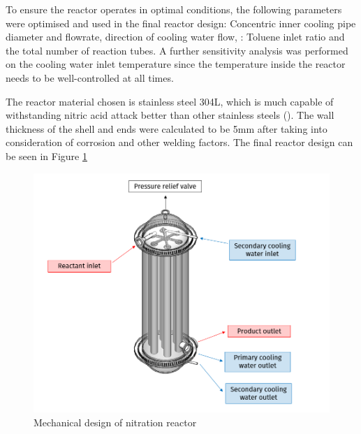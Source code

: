 To ensure the reactor operates in optimal conditions, the following parameters were optimised and used in the final reactor design: Concentric inner cooling pipe diameter and flowrate, direction of cooling water flow,  : Toluene inlet ratio and the total number of reaction tubes. A further sensitivity analysis was performed on the cooling water inlet temperature since the temperature inside the reactor needs to be well-controlled at all times. %


The reactor material chosen is stainless steel 304L, which is much capable of withstanding nitric acid attack better than other stainless steels (). The wall thickness of the shell and ends were calculated to be 5mm after taking into consideration of corrosion and other welding factors. 
The final reactor design can be seen in Figure \ref{fig:executivesummaryreactor}
\begin{figure}[h]
    \centering
    \includegraphics[width=0.7\linewidth]{chapters/0-executive-summary/figures/FYD executive sum.PNG}
    \caption{Mechanical design of nitration reactor}
    \label{fig:executivesummaryreactor}
\end{figure}